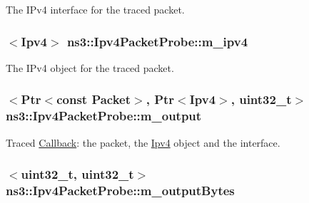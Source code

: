 The I\+Pv4 interface for the traced packet. 

\subsubsection[{\texorpdfstring{m\+\_\+ipv4}{m_ipv4}}]{$<${\bf Ipv4}$>$ ns3\+::\+Ipv4\+Packet\+Probe\+::m\+\_\+ipv4\hspace{0.3cm}{\ttfamily [private]}}\hypertarget{classns3_1_1Ipv4PacketProbe_af9e89c6f1e0c7985487bfcaaf1acd8d6}{}\label{classns3_1_1Ipv4PacketProbe_af9e89c6f1e0c7985487bfcaaf1acd8d6}


The I\+Pv4 object for the traced packet. 

\subsubsection[{\texorpdfstring{m\+\_\+output}{m_output}}]{$<${\bf Ptr}$<$const {\bf Packet}$>$, {\bf Ptr}$<${\bf Ipv4}$>$, uint32\+\_\+t$>$ ns3\+::\+Ipv4\+Packet\+Probe\+::m\+\_\+output\hspace{0.3cm}{\ttfamily [private]}}\hypertarget{classns3_1_1Ipv4PacketProbe_a7c5ef989cc92b4b2d09daa3cf4335cb0}{}\label{classns3_1_1Ipv4PacketProbe_a7c5ef989cc92b4b2d09daa3cf4335cb0}


Traced \hyperlink{classns3_1_1Callback}{Callback}\+: the packet, the \hyperlink{classns3_1_1Ipv4}{Ipv4} object and the interface. 

\subsubsection[{\texorpdfstring{m\+\_\+output\+Bytes}{m_outputBytes}}]{$<$uint32\+\_\+t, uint32\+\_\+t$>$ ns3\+::\+Ipv4\+Packet\+Probe\+::m\+\_\+output\+Bytes\hspace{0.3cm}{\ttfamily [private]}}\hypertarget{classns3_1_1Ipv4PacketProbe_a4e8701fc7f85299b2cc6d8fd5082202c}{}\label{classns3_1_1Ipv4PacketProbe_a4e8701fc7f85299b2cc6d8fd5082202c}


